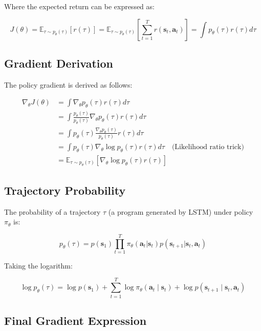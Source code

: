 \documentclass[10pt, oneside]{article}
\begin{document}
Where the expected return can be expressed as:

\begin{equation}
    J(\theta) = \mathbb{E}_{\tau \sim p_{\theta}(\tau)} [r(\tau)] = \mathbb{E}_{\tau \sim p_{\theta}(\tau)} [\sum_{t=1}^{T} r(\mathbf{s}_{t}, \mathbf{a}_{t})] = \int p_{\theta}(\tau) r(\tau) d\tau
\end{equation}

\subsection{Gradient Derivation}
The policy gradient is derived as follows:

\begin{align}
    \nabla_{\theta} J(\theta) &= \int \nabla_{\theta} p_{\theta}(\tau) r(\tau) d\tau \\
    &= \int \frac{p_{\theta}(\tau)}{p_{\theta}(\tau)} \nabla_{\theta} p_{\theta}(\tau) r(\tau) d\tau \\
    &= \int p_{\theta}(\tau) \frac{\nabla_{\theta} p_{\theta}(\tau)}{p_{\theta}(\tau)}  r(\tau) d\tau \\
    &= \int p_{\theta}(\tau) \nabla_{\theta} \log p_{\theta}(\tau) r(\tau) d\tau \quad \text{(Likelihood ratio trick)} \\
    &= \mathbb{E}_{\tau \sim p_{\theta}(\tau)} \left[ \nabla_{\theta} \log p_{\theta}(\tau) r(\tau) \right]
\end{align}

\subsection{Trajectory Probability}
The probability of a trajectory $\tau$ (a program generated by LSTM) under policy $\pi_\theta$ is:

\begin{equation}
    p_{\theta}(\tau) = p(\mathbf{s}_{1})\prod_{t=1}^{T}\pi_{\theta}(\mathbf{a}_{t}|\mathbf{s}_{t})p(\mathbf{s}_{t+1}|\mathbf{s}_{t},\mathbf{a}_{t})
\end{equation}

Taking the logarithm:

\begin{equation}
    \log p_{\theta}(\tau) = \log p(\mathbf{s}_{1}) + \sum_{t=1}^{T} \log \pi_{\theta}(\mathbf{a}_{t} \mid \mathbf{s}_{t}) + \log p(\mathbf{s}_{t+1} \mid \mathbf{s}_{t}, \mathbf{a}_{t})
\end{equation}

\subsection{Final Gradient Expression}
\end{document}
